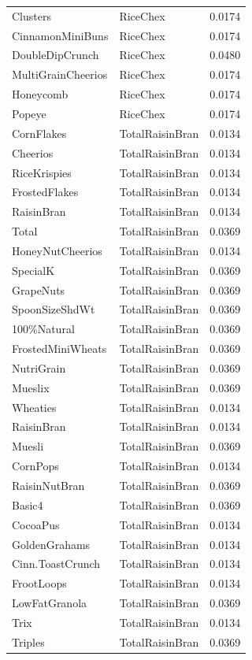 \begin{longtable}{llr}
Clusters & RiceChex & 0.0174 \\
CinnamonMiniBuns & RiceChex & 0.0174 \\
DoubleDipCrunch & RiceChex & 0.0480 \\
MultiGrainCheerios & RiceChex & 0.0174 \\
Honeycomb & RiceChex & 0.0174 \\
Popeye & RiceChex & 0.0174 \\
CornFlakes & TotalRaisinBran & 0.0134 \\
Cheerios & TotalRaisinBran & 0.0134 \\
RiceKrispies & TotalRaisinBran & 0.0134 \\
FrostedFlakes & TotalRaisinBran & 0.0134 \\
RaisinBran & TotalRaisinBran & 0.0134 \\
Total & TotalRaisinBran & 0.0369 \\
HoneyNutCheerios & TotalRaisinBran & 0.0134 \\
SpecialK & TotalRaisinBran & 0.0369 \\
GrapeNuts & TotalRaisinBran & 0.0369 \\
SpoonSizeShdWt & TotalRaisinBran & 0.0369 \\
100\%Natural & TotalRaisinBran & 0.0369 \\
FrostedMiniWheats & TotalRaisinBran & 0.0369 \\
NutriGrain & TotalRaisinBran & 0.0369 \\
Mueslix & TotalRaisinBran & 0.0369 \\
Wheaties & TotalRaisinBran & 0.0134 \\
RaisinBran & TotalRaisinBran & 0.0134 \\
Muesli & TotalRaisinBran & 0.0369 \\
CornPops & TotalRaisinBran & 0.0134 \\
RaisinNutBran & TotalRaisinBran & 0.0369 \\
Basic4 & TotalRaisinBran & 0.0369 \\
CocoaPus & TotalRaisinBran & 0.0134 \\
GoldenGrahams & TotalRaisinBran & 0.0134 \\
Cinn.ToastCrunch & TotalRaisinBran & 0.0134 \\
FrootLoops & TotalRaisinBran & 0.0134 \\
LowFatGranola & TotalRaisinBran & 0.0369 \\
Trix & TotalRaisinBran & 0.0134 \\
Triples & TotalRaisinBran & 0.0369 \\

\end{longtable}
